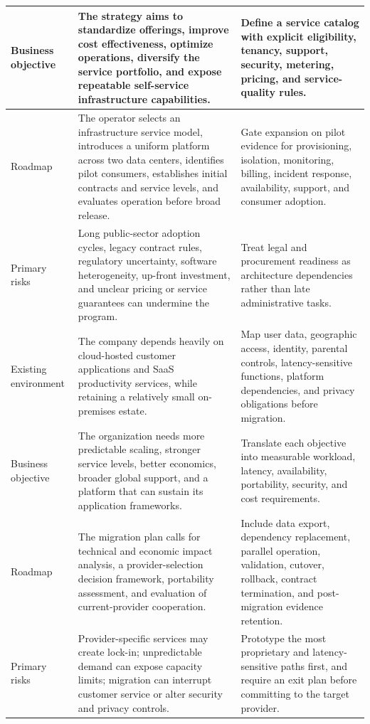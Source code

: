 \documentclass[11pt]{article}
\begin{document}
\begin{longtable}{@{}>{\RaggedRight\arraybackslash}p{}>{\RaggedRight\arraybackslash}p{}>{\RaggedRight\arraybackslash}p{}@{}}
Business objective & The strategy aims to standardize offerings, improve cost effectiveness, optimize operations, diversify the service portfolio, and expose repeatable self-service infrastructure capabilities. & Define a service catalog with explicit eligibility, tenancy, support, security, metering, pricing, and service-quality rules. \\\midrule
Roadmap & The operator selects an infrastructure service model, introduces a uniform platform across two data centers, identifies pilot consumers, establishes initial contracts and service levels, and evaluates operation before broad release. & Gate expansion on pilot evidence for provisioning, isolation, monitoring, billing, incident response, availability, support, and consumer adoption. \\\midrule
Primary risks & Long public-sector adoption cycles, legacy contract rules, regulatory uncertainty, software heterogeneity, up-front investment, and unclear pricing or service guarantees can undermine the program. & Treat legal and procurement readiness as architecture dependencies rather than late administrative tasks. \\\midrule
Existing environment & The company depends heavily on cloud-hosted customer applications and SaaS productivity services, while retaining a relatively small on-premises estate. & Map user data, geographic access, identity, parental controls, latency-sensitive functions, platform dependencies, and privacy obligations before migration. \\\midrule
Business objective & The organization needs more predictable scaling, stronger service levels, better economics, broader global support, and a platform that can sustain its application frameworks. & Translate each objective into measurable workload, latency, availability, portability, security, and cost requirements. \\\midrule
Roadmap & The migration plan calls for technical and economic impact analysis, a provider-selection decision framework, portability assessment, and evaluation of current-provider cooperation. & Include data export, dependency replacement, parallel operation, validation, cutover, rollback, contract termination, and post-migration evidence retention. \\\midrule
Primary risks & Provider-specific services may create lock-in; unpredictable demand can expose capacity limits; migration can interrupt customer service or alter security and privacy controls. & Prototype the most proprietary and latency-sensitive paths first, and require an exit plan before committing to the target provider. \\\midrule

\end{longtable}
\end{document}

